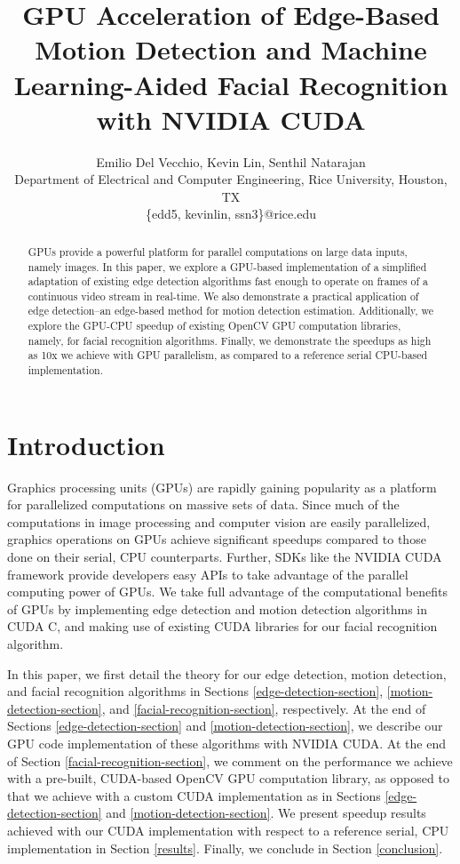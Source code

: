 \documentclass[journal]{IEEEtran}
\begin{document}
\title{GPU Acceleration of Edge-Based Motion Detection and Machine Learning-Aided Facial Recognition with NVIDIA CUDA}

\author{
	Emilio Del Vecchio, Kevin Lin, Senthil Natarajan\\
	Department of Electrical and Computer Engineering, Rice University, Houston, TX\\
	\{edd5, kevinlin, ssn3\}@rice.edu
}

\maketitle


\begin{abstract}
GPUs provide a powerful platform for parallel computations on large data inputs, namely images. In this paper, we explore a GPU-based implementation of a simplified adaptation of existing edge detection algorithms fast enough to operate on frames of a continuous video stream in real-time. We also demonstrate a practical application of edge detection--an edge-based method for motion detection estimation. Additionally, we explore the GPU-CPU speedup of existing OpenCV GPU computation libraries, namely, for facial recognition algorithms. Finally, we demonstrate the speedups as high as 10x we achieve with GPU parallelism, as compared to a reference serial CPU-based implementation.
\end{abstract}


\section{Introduction}
Graphics processing units (GPUs) are rapidly gaining popularity as a platform for parallelized computations on massive sets of data. Since much of the computations in image processing and computer vision are easily parallelized, graphics operations on GPUs achieve significant speedups compared to those done on their serial, CPU counterparts. Further, SDKs like the NVIDIA CUDA framework provide developers easy APIs to take advantage of the parallel computing power of GPUs. We take full advantage of the computational benefits of GPUs by implementing edge detection and motion detection algorithms in CUDA C, and making use of existing CUDA libraries for our facial recognition algorithm.
\par In this paper, we first detail the theory for our edge detection, motion detection, and facial recognition algorithms in Sections \ref{edge-detection-section}, \ref{motion-detection-section}, and \ref{facial-recognition-section}, respectively. At the end of Sections \ref{edge-detection-section} and \ref{motion-detection-section}, we describe our GPU code implementation of these algorithms with NVIDIA CUDA. At the end of Section \ref{facial-recognition-section}, we comment on the performance we achieve with a pre-built, CUDA-based OpenCV GPU computation library, as opposed to that we achieve with a custom CUDA implementation as in Sections \ref{edge-detection-section} and \ref{motion-detection-section}. We present speedup results achieved with our CUDA implementation with respect to a reference serial, CPU implementation in Section \ref{results}. Finally, we conclude in Section \ref{conclusion}.
\end{document}
